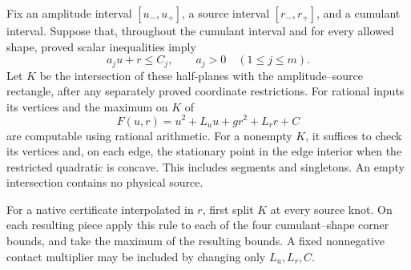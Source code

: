 \begin{lemma}
\label{lem:physical-source-polygon-price}
Fix an amplitude interval $[u_-,u_+]$, a source interval $[r_-,r_+]$,
and a cumulant interval. Suppose that, throughout the cumulant interval
and for every allowed shape, proved scalar inequalities imply
\[
 a_j u+r\le C_j,\qquad a_j>0\quad(1\le j\le m).
\]
Let $K$ be the intersection of these half-planes with the amplitude--source
rectangle, after any separately proved coordinate restrictions.
For rational inputs its vertices and the maximum on $K$ of
\[
 F(u,r)=u^2+L_u u+g r^2+L_r r+C
\]
are computable using rational arithmetic. For a nonempty $K$, it suffices
to check its vertices and, on each edge, the stationary point in the edge
interior when the restricted quadratic is concave. This includes segments
and singletons. An empty intersection contains no physical source.

For a native certificate interpolated in $r$, first split $K$ at every
source knot. On each resulting piece apply this rule to each of the four
cumulant--shape corner bounds, and take the maximum of the resulting
bounds. A fixed nonnegative contact multiplier may be included by changing
only $L_u,L_r,C$.
\end{lemma}
